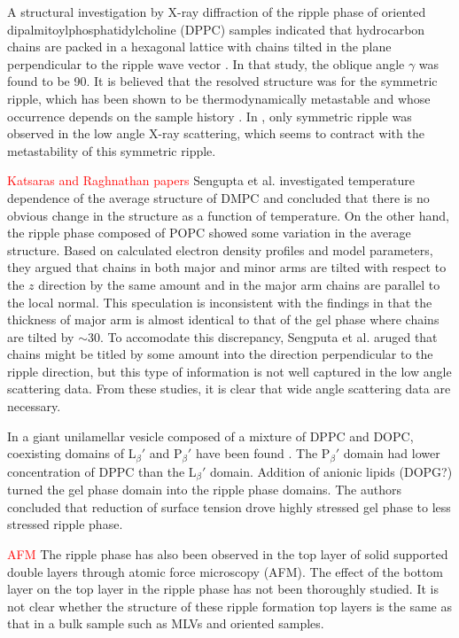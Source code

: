 A structural investigation by X-ray diffraction of the ripple phase of
oriented dipalmitoylphosphatidylcholine (DPPC) samples indicated that
hydrocarbon chains are packed in a hexagonal lattice with chains
tilted in the plane perpendicular to the ripple wave vector \cite{ref:Hentschel91}.
In that study, the oblique angle $\gamma$ was found to be 90\textdegree.
It is believed that the resolved structure was for the symmetric ripple,
which has been shown to be thermodynamically metastable and whose occurrence
depends on the sample history \cite{ref:Katsaras00}. 
In \cite{ref:Hentschel91}, only symmetric ripple was observed in the low angle
X-ray scattering, which seems to contract with the metastability of this 
symmetric ripple.

\textcolor{red}{Katsaras and Raghnathan papers}
Sengupta et al. investigated temperature dependence of the average structure
of DMPC and concluded that there is no obvious change in the structure
as a function of temperature. On the other hand, the ripple phase composed of 
POPC showed some variation in the average structure.
Based on calculated electron density profiles and model parameters, they
argued that chains in both major and minor arms are tilted with respect to 
the $z$ direction by the same amount and  
in the major arm chains are parallel to the local normal. This speculation 
is inconsistent with the findings in \cite{ref:Sun96} that
the thickness of major arm is almost identical to that of the gel phase where chains 
are tilted by $\sim$30\textdegree. To accomodate this discrepancy, 
Sengputa et al. aruged that chains might be titled by some amount into the 
direction perpendicular to the ripple direction, but this type of information
is not well captured in the low angle scattering data.
From these studies, it is 
clear that wide angle scattering data are necessary.

In a giant unilamellar vesicle composed of a mixture of DPPC and DOPC, 
coexisting domains of L$_\beta'$ and P$_\beta'$ have been found \cite{ref:Li06}.
The P$_\beta'$ domain had lower concentration of DPPC than the L$_\beta'$
domain. Addition of anionic lipids (DOPG?) turned the gel phase domain
into the ripple phase domains. The authors concluded that reduction of 
surface tension drove highly stressed gel phase to less stressed ripple phase.

\textcolor{red}{AFM}
The ripple phase has also been observed in the top layer of 
solid supported double layers through atomic force microscopy (AFM).
The effect of the bottom layer on the top layer in the ripple phase has not been
thoroughly studied. 
It is not clear whether the structure of these ripple formation top layers
is the same as that in a bulk sample such as MLVs and oriented samples.

